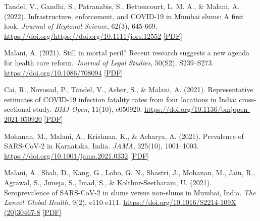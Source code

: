 \begin{tablist}
        \item[2022] \tab{}Tandel, V., Gandhi, S., Patranabis, S., Bettencourt, L. M. A., \& Malani, A. (2022). Infrastructure, enforcement, and COVID-19 in Mumbai slums: A first look. \textit{Journal of Regional Science}, 62(3), 645-669. \href{https://doi.org/https://doi.org/10.1111/jors.12552}{https://doi.org/https://doi.org/10.1111/jors.12552} \href{https://github.com/anup-malani/website_personal/blob/main/publications/2022_ShengMalaniEtAl_JUE_SlumMobilityCOVID.pdf}{[PDF]} 

        \item[2021] \tab{}Malani, A. (2021). Still in mortal peril? Recent research suggests a new agenda for health care reform. \textit{Journal of Legal Studies}, 50(S2), S239–S273. \href{https://doi.org/10.1086/708094}{https://doi.org/10.1086/708094} \href{https://github.com/anup-malani/website_personal/blob/main/publications/2021_Malani_JLS_MortalPeril.pdf}{[PDF]}
        
        \item[2021] \tab{}Cai, R., Novosad, P., Tandel, V., Asher, S., \& Malani, A. (2021). Representative estimates of COVID-19 infection fatality rates from four locations in India: cross-sectional study. \textit{BMJ Open}, 11(10), e050920. \href{https://doi.org/10.1136/bmjopen-2021-050920}{https://doi.org/10.1136/bmjopen-2021-050920} \href{https://github.com/anup-malani/website_personal/blob/main/publications/2021_Malani_JLS_MortalPeril.pdf}{[PDF]}
        
        \item[2021] \tab{}Mohanan, M., Malani, A., Krishnan, K., \& Acharya, A. (2021). Prevalence of SARS-CoV-2 in Karnataka, India. \textit{JAMA}, 325(10), 1001–1003. \href{https://doi.org/10.1001/jama.2021.0332}{https://doi.org/10.1001/jama.2021.0332} \href{https://github.com/anup-malani/website_personal/blob/main/publications/2021_MohananMalani_JAMA_COVIDKarnatakaSero.pdf}{[PDF]}
        
        \item[2021] \tab{}Malani, A., Shah, D., Kang, G., Lobo, G. N., Shastri, J., Mohanan, M., Jain, R., Agrawal, S., Juneja, S., Imad, S., \& Kolthur-Seetharam, U. (2021). Seroprevalence of SARS-CoV-2 in slums versus non-slums in Mumbai, India. \textit{The Lancet Global Health}, 9(2), e110-e111. \href{https://doi.org/10.1016/S2214-109X(20)30467-8}{https://doi.org/10.1016/S2214-109X (20)30467-8} \href{https://github.com/anup-malani/website_personal/blob/main/publications/2021_MalaniEtAl_LancetGH_SeroMumbaiSlums.pdf}{[PDF]}


\end{tablist}
